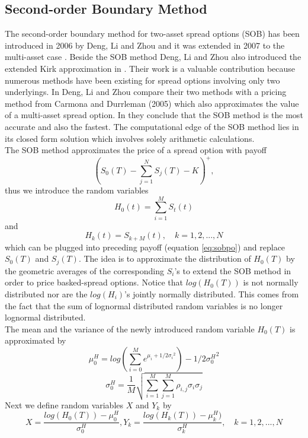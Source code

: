 \documentclass[a4paper]{article}
\begin{document}
\subsection{Second-order Boundary Method}
\label{sec:sob}
The second-order boundary method for two-asset spread options (SOB) has been introduced in 2006 by Deng, Li and Zhou \cite{sob2} and it was extended in 2007 to the multi-asset case \cite{sob}. Beside the SOB method Deng, Li and Zhou also introduced the extended Kirk approximation in \cite{sob}. Their work is a valuable contribution because numerous methods have been existing for spread options involving only two underlyings. In \cite{sob} Deng, Li and Zhou compare their two methods with a pricing method from Carmona and Durrleman (2005) \cite{cd} which also approximates the value of a multi-asset spread option. In \cite{sob} they conclude that the SOB method is the most accurate and also the fastest. The computational edge of the SOB method lies in its closed form solution which involves solely arithmetic calculations.\\
The SOB method approximates the price of a spread option with payoff
\begin{equation}
\label{eq:sobpo}
(S_0(T) - \sum_{j=1}^{N}S_j(T) - K)^+, 
\end{equation}
thus we introduce the random variables 
$$H_0(t)=\sum_{i=1}^M S_t(t)$$ 
and 
$$H_k(t)=S_{k+M}(t), \quad k=1,2,...,N$$
which can be plugged into preceding payoff (equation \ref{eq:sobpo}) and replace $S_0(T)$ and $S_j(T)$. The idea is to approximate the distribution of $H_0(T)$ by the geometric averages of the corresponding  $S_i$'s to extend the SOB method in order to price basked-spread options. Notice that $log(H_0(T))$ is not normally distributed nor are the $log(H_i)$'s jointly normally distributed. This comes from the fact that the sum of lognormal distributed random variables is no longer lognormal distributed.\\
The mean and the variance of the newly introduced random variable $H_0(T)$ is approximated by 
\begin{equation}
\mu_0^H = log(\sum_{i=0}^{M}e^{\mu_i+1/2{\sigma_i}^2}) - 1/2{\sigma_0^H}^2
\end{equation}
\begin{equation}
\sigma_0^H=\frac{1}{M}\sqrt{\sum_{i=1}^M \sum_{j=1}^M \rho_{i,j} \sigma_i \sigma_j}
\end{equation}
Next we define random variables $X$ and $Y_k$ by
$$X = \frac{log(H_0(T))-\mu_0^H}{\sigma_0^H}, Y_k = \frac{log(H_k(T))-\mu_k^H)}{\sigma_k^H}, \quad k=1,2,...,N$$
\end{document}
